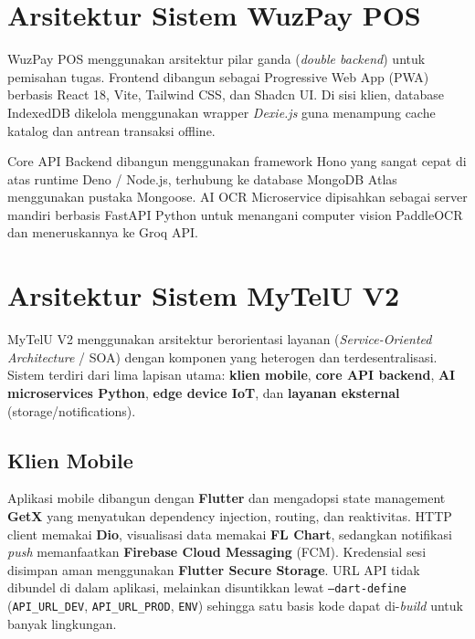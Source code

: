 \documentclass[12pt,titlepage,a4paper]{report}
\begin{document}
\section{Arsitektur Sistem WuzPay POS}
WuzPay POS menggunakan arsitektur pilar ganda (\textit{double backend}) untuk pemisahan tugas.
Frontend dibangun sebagai Progressive Web App (PWA) berbasis React 18, Vite, Tailwind CSS, dan Shadcn UI. Di sisi klien, database IndexedDB dikelola menggunakan wrapper \textit{Dexie.js} guna menampung cache katalog dan antrean transaksi offline.

Core API Backend dibangun menggunakan framework Hono yang sangat cepat di atas runtime Deno / Node.js, terhubung ke database MongoDB Atlas menggunakan pustaka Mongoose. AI OCR Microservice dipisahkan sebagai server mandiri berbasis FastAPI Python untuk menangani computer vision PaddleOCR dan meneruskannya ke Groq API.

\section{Arsitektur Sistem MyTelU V2}
MyTelU V2 menggunakan arsitektur berorientasi layanan (\textit{Service-Oriented Architecture} / SOA) dengan komponen yang heterogen dan terdesentralisasi. Sistem terdiri dari lima lapisan utama: \textbf{klien mobile}, \textbf{core API backend}, \textbf{AI microservices Python}, \textbf{edge device IoT}, dan \textbf{layanan eksternal} (storage/notifications).

\subsection{Klien Mobile}
Aplikasi mobile dibangun dengan \textbf{Flutter} dan mengadopsi state management \textbf{GetX} yang menyatukan dependency injection, routing, dan reaktivitas. HTTP client memakai \textbf{Dio}, visualisasi data memakai \textbf{FL Chart}, sedangkan notifikasi \textit{push} memanfaatkan \textbf{Firebase Cloud Messaging} (FCM). Kredensial sesi disimpan aman menggunakan \textbf{Flutter Secure Storage}. URL API tidak dibundel di dalam aplikasi, melainkan disuntikkan lewat \texttt{--dart-define} (\texttt{API\_URL\_DEV}, \texttt{API\_URL\_PROD}, \texttt{ENV}) sehingga satu basis kode dapat di-\textit{build} untuk banyak lingkungan.
\end{document}
